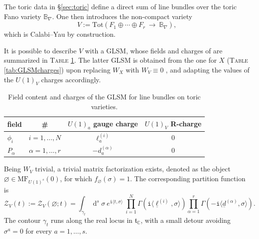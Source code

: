 \documentclass[12pt,a4paper,oneside]{amsart}
\numberwithin{equation}{section}
\theoremstyle{definition}
\theoremstyle{remark}
\DeclareMathOperator{\C}{\mathbb{C}}
\DeclareMathOperator{\dd}{d}
\newcommand{\cB}{\mathbb{B}}
\newcommand{\mz}{\mathcal{Z}}
\newcommand{\MF}{\mathrm{MF}}
\newcommand{\ii}{\mathtt{i}}
\begin{document}
\begin{appendix}
The toric data in \S\ref{sec:toric} define a direct sum of line bundles over the toric Fano variety $\cB_{\nabla} $. One then introduces the non-compact variety 
\begin{equation*}
	V := \mathrm{Tot} \left( F_1 \oplus \cdots \oplus F_r \ \longrightarrow \ \cB_{\nabla}  \right) ,
\end{equation*}
which is Calabi--Yau by construction.\par 
It is possible to describe $V$ with a GLSM, whose fields and charges of are summarized in \textsc{Table} \ref{tab:GLSMambient}. The latter GLSM is obtained from the one for $X$ (\textsc{Table} \ref{tab:GLSMcharges}) upon replacing $W_X$ with $W_V \equiv 0$ \cite{Morrison:1994fr}, and adapting the values of the $U(1)_V$ charges accordingly.\par
\begin{table}[th]
\centering
\begin{tabular}{l |c |c | c}
	field & \# & $U(1)_a$ gauge charge & $U(1)_V$ R-charge \\
	\hline
	$\phi_i$ & $i=1, \dots, N$ & $\ell_a ^{(i)}$ & $0$ \\
	$P_{\alpha}$ & $\alpha=1, \dots, r$ & $- d_a^{(\alpha)}$ & $0$\\
	\hline
\end{tabular}
\caption{Field content and charges of the GLSM for line bundles on toric varieties.}
\label{tab:GLSMambient}
\end{table}\par
Being $W_V$ trivial, a trivial matrix factorization exists, denoted as the object $\varnothing \in \MF_{U(1)^s} (0)$, for which $f_{\varnothing} (\sigma)=1$. The corresponding partition function is 
\begin{equation}
\label{eq:Zambient}
	\mz_{V} \left( t \right) := \mz_{V} \left( \varnothing ; t \right) = \int_{\gamma_t} \dd^s \sigma~e^{\ii \langle t, \sigma\rangle} ~\prod_{i=1}^{N} \Gamma \left(\ii \langle \underline{\ell}^{(i)}, \sigma \rangle \right) \prod_{\alpha=1}^{r} \Gamma \left( -\ii \langle\underline{d}^{(\alpha)}, \sigma \rangle \right) .
\end{equation}
The contour $\gamma_t$ runs along the real locus in $\mathfrak{t}_{\C}$, with a small detour avoiding $\sigma^{a}=0$ for every $a=1, \dots, s$.





\end{appendix}
\end{document}
